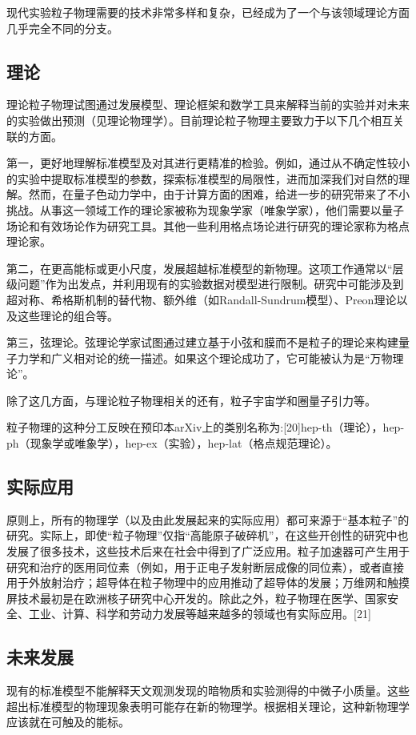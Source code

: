 现代实验粒子物理需要的技术非常多样和复杂，已经成为了一个与该领域理论方面几乎完全不同的分支。

\subsection{理论}
理论粒子物理试图通过发展模型、理论框架和数学工具来解释当前的实验并对未来的实验做出预测（见理论物理学）。目前理论粒子物理主要致力于以下几个相互关联的方面。

第一，更好地理解标准模型及对其进行更精准的检验。例如，通过从不确定性较小的实验中提取标准模型的参数，探索标准模型的局限性，进而加深我们对自然的理解。然而，在量子色动力学中，由于计算方面的困难，给进一步的研究带来了不小挑战。从事这一领域工作的理论家被称为现象学家（唯象学家），他们需要以量子场论和有效场论作为研究工具。其他一些利用格点场论进行研究的理论家称为格点理论家。

第二，在更高能标或更小尺度，发展超越标准模型的新物理。这项工作通常以“层级问题”作为出发点，并利用现有的实验数据对模型进行限制。研究中可能涉及到超对称、希格斯机制的替代物、额外维（如Randall-Sundrum模型）、Preon理论以及这些理论的组合等。

第三，弦理论。弦理论学家试图通过建立基于小弦和膜而不是粒子的理论来构建量子力学和广义相对论的统一描述。如果这个理论成功了，它可能被认为是“万物理论”。

除了这几方面，与理论粒子物理相关的还有，粒子宇宙学和圈量子引力等。

粒子物理的这种分工反映在预印本arXiv上的类别名称为:[20]hep-th（理论），hep-ph（现象学或唯象学），hep-ex（实验），hep-lat（格点规范理论）。

\subsection{实际应用}
原则上，所有的物理学（以及由此发展起来的实际应用）都可来源于“基本粒子”的研究。实际上，即使“粒子物理”仅指“高能原子破碎机”，在这些开创性的研究中也发展了很多技术，这些技术后来在社会中得到了广泛应用。粒子加速器可产生用于研究和治疗的医用同位素（例如，用于正电子发射断层成像的同位素），或者直接用于外放射治疗；超导体在粒子物理中的应用推动了超导体的发展；万维网和触摸屏技术最初是在欧洲核子研究中心开发的。除此之外，粒子物理在医学、国家安全、工业、计算、科学和劳动力发展等越来越多的领域也有实际应用。[21]

\subsection{未来发展}
现有的标准模型不能解释天文观测发现的暗物质和实验测得的中微子小质量。这些超出标准模型的物理现象表明可能存在新的物理学。根据相关理论，这种新物理学应该就在可触及的能标。

